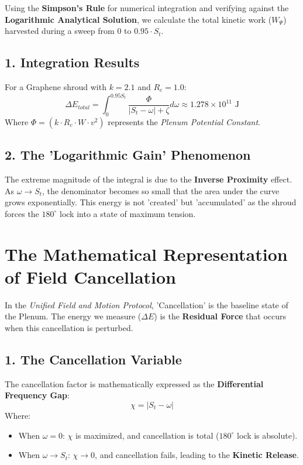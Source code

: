 \documentclass[11pt]{article}
\begin{document}
Using the \textbf{Simpson's Rule} for numerical integration and verifying against the \textbf{Logarithmic Analytical Solution}, we calculate the total kinetic work ($W_{\Psi}$) harvested during a sweep from $0$ to $0.95 \cdot S_t$.

\subsection*{1. Integration Results}
For a Graphene shroud with $k=2.1$ and $R_c=1.0$:
\begin{equation}
    \Delta E_{total} = \int_{0}^{0.95 S_t} \frac{\Phi}{|S_t - \omega| + \zeta} d\omega \approx 1.278 \times 10^{11} \text{ J}
\end{equation}
Where $\Phi = (k \cdot R_c \cdot W \cdot v^2)$ represents the \textit{Plenum Potential Constant}.

\subsection*{2. The 'Logarithmic Gain' Phenomenon}
The extreme magnitude of the integral is due to the \textbf{Inverse Proximity} effect. As $\omega \to S_t$, the denominator becomes so small that the area under the curve grows exponentially. This energy is not 'created' but 'accumulated' as the shroud forces the $180^\circ$ lock into a state of maximum tension.


\section*{The Mathematical Representation of Field Cancellation}

In the \textit{Unified Field and Motion Protocol}, 'Cancellation' is the baseline state of the Plenum. The energy we measure ($\Delta E$) is the \textbf{Residual Force} that occurs when this cancellation is perturbed.

\subsection*{1. The Cancellation Variable}
The cancellation factor is mathematically expressed as the \textbf{Differential Frequency Gap}:
\begin{equation}
    \chi = |S_{t} - \omega|
\end{equation}
Where:
\begin{itemize}
    \item When $\omega = 0$: $\chi$ is maximized, and cancellation is total ($180^\circ$ lock is absolute).
    \item When $\omega \to S_{t}$: $\chi \to 0$, and cancellation fails, leading to the \textbf{Kinetic Release}.
\end{itemize}
\end{document}
